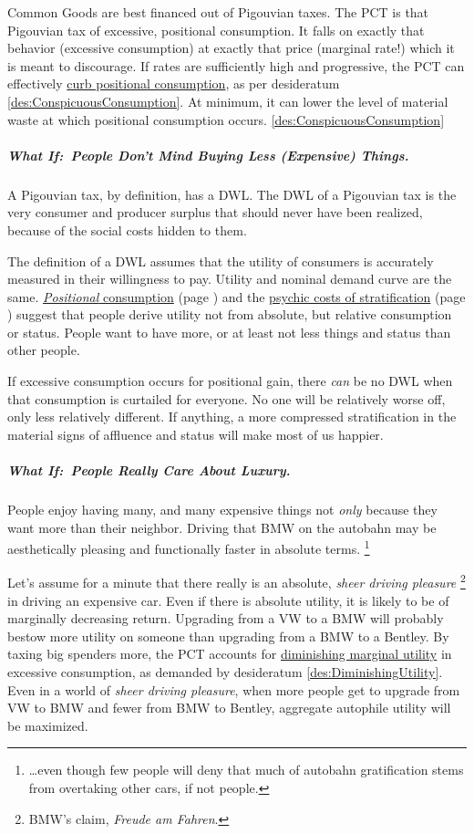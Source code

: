 Common Goods are best financed out of Pigouvian taxes.
The PCT is that Pigouvian tax of excessive, positional consumption.
It falls on exactly that behavior (excessive consumption) at exactly that price (marginal rate!) which it is meant to discourage.
If rates are sufficiently high and progressive, the PCT can effectively \hyperref[des:ConspicuousConsumption]{curb positional consumption}, as per desideratum \ref{des:ConspicuousConsumption}.
At minimum, it can lower the level of material waste at which positional consumption occurs.
\ref{des:ConspicuousConsumption}

\subparagraph{What If:~People Don't Mind Buying Less (Expensive) Things.}
A Pigouvian tax, by definition, has a DWL.
The DWL of a Pigouvian tax is the very consumer and producer surplus that should never have been realized, because of the social costs hidden to them.

The definition of a DWL assumes that the utility of consumers is accurately measured in their willingness to pay.
Utility and nominal demand curve are the same.
\hyperref[sec:ConspicuousConsumption]{\emph{Positional} consumption} (page \pageref{sec:ConspicuousConsumption}) and the \hyperref[sec:PsychicCosts]{psychic costs of stratification} (page \pageref{sec:PsychicCosts}) suggest that people derive utility not from absolute, but relative consumption or status.
People want to have more, or at least not less things and status than other people.

If excessive consumption occurs for positional gain, there \emph{can} be no DWL when that consumption is curtailed for everyone.
No one will be relatively worse off, only less relatively different.
If anything, a more compressed stratification in the material signs of affluence and status will make most of us happier.

\subparagraph{What If:~People Really Care About Luxury.}
People enjoy having many, and many expensive things not \emph{only} because they want more than their neighbor.
Driving that BMW on the autobahn may be aesthetically pleasing and functionally faster in absolute terms.
\footnote{
	\ldots even though few people will deny that much of autobahn gratification stems from overtaking other cars, if not people.
}

Let's assume for a minute that there really is an absolute, \emph{sheer driving pleasure}
\footnote{
	BMW's claim, \emph{Freude am Fahren}.
}
in driving an expensive car.
Even if there is absolute utility, it is likely to be of marginally decreasing return.
Upgrading from a VW to a BMW will probably bestow more utility on someone than upgrading from a BMW to a Bentley.
By taxing big spenders more, the PCT accounts for \hyperref[des:DiminishingUtility]{diminishing marginal utility} in excessive consumption, as demanded by desideratum \ref{des:DiminishingUtility}.
Even in a world of \emph{sheer driving pleasure}, when more people get to upgrade from VW to BMW and fewer from BMW to Bentley, aggregate autophile utility will be maximized.

